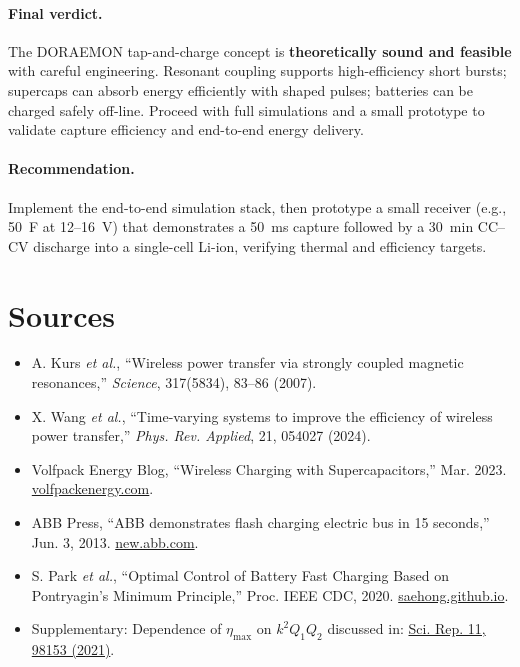 \documentclass[11pt]{article}
\begin{document}
\paragraph{Final verdict.} The DORAEMON tap-and-charge concept is \textbf{theoretically sound and feasible} with careful engineering. Resonant coupling supports high-efficiency short bursts; supercaps can absorb energy efficiently with shaped pulses; batteries can be charged safely off-line. Proceed with full simulations and a small prototype to validate capture efficiency and end-to-end energy delivery.

\paragraph{Recommendation.} Implement the end-to-end simulation stack, then prototype a small receiver (e.g., 50~F at 12--16~V) that demonstrates a 50~ms capture followed by a 30~min CC--CV discharge into a single-cell Li-ion, verifying thermal and efficiency targets.

\section*{Sources}
\begin{itemize}
  \item A. Kurs \emph{et al.}, ``Wireless power transfer via strongly coupled magnetic resonances,'' \emph{Science}, 317(5834), 83--86 (2007).
  \item X. Wang \emph{et al.}, ``Time-varying systems to improve the efficiency of wireless power transfer,'' \emph{Phys. Rev. Applied}, 21, 054027 (2024).
  \item Volfpack Energy Blog, ``Wireless Charging with Supercapacitors,'' Mar. 2023. \href{https://www.volfpackenergy.com/post/wireless-charging-with-supercapacitors}{volfpackenergy.com}.\label{volfpack-blog}
  \item ABB Press, ``ABB demonstrates flash charging electric bus in 15 seconds,'' Jun. 3, 2013. \href{https://new.abb.com/news/detail/43929/abb-demonstrates-technology-to-power-flash-charging-electric-bus-in-15-seconds}{new.abb.com}.\label{abb-bus}
  \item S. Park \emph{et al.}, ``Optimal Control of Battery Fast Charging Based on Pontryagin's Minimum Principle,'' Proc. IEEE CDC, 2020. \href{https://saehong.github.io/files/CDC2020-PMP.pdf}{saehong.github.io}.\label{pmp-battery}
  \item Supplementary: Dependence of $\eta_{\max}$ on $k^2Q_1Q_2$ discussed in: \href{https://www.nature.com/articles/s41598-021-98153-y}{Sci. Rep. 11, 98153 (2021)}.\label{nature-wpt}
\end{itemize}
\end{document}
